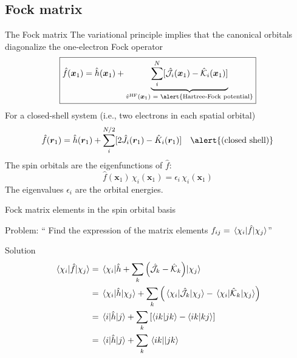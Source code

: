 \documentclass[aspectratio=169,9pt]{beamer}
\newcommand{\br}{\boldsymbol{r}}
\newcommand{\bx}{\boldsymbol{x}}
\newcommand{\hh}{\hat{h}}
\newcommand{\hf}{\hat{f}}
\newcommand{\hJ}{\hat{J}}
\newcommand{\hK}{\hat{K}}
\newcommand{\chJ}{\Hat{\mathcal{J}}}
\newcommand{\chK}{\Hat{\mathcal{K}}}
\newcommand{\violet}[1]{\textcolor{hfViolet}{#1}}
\begin{document}
\subsection{Fock matrix}
\begin{frame}{The Fock matrix}
	The \alert{variational principle} implies that the canonical orbitals diagonalize the \alert{one-electron Fock operator}
	\begin{equation*}
		\boxed{ \hf(\bx_1) = \hh(\bx_1) + \underbrace{\sum_i^N [\chJ_i(\bx_1) - \chK_i(\bx_1)]}_{\Hat{v}^\text{HF}(\bx_1) \text{ = \alert{Hartree-Fock potential}}}}
	\end{equation*}	
	 For a \alert{closed-shell system} (i.e., two electrons in each spatial orbital)
	 \begin{equation*}
		\hf(\br_1) = \hh(\br_1) + \sum_i^{N/2} [2 \hJ_i(\br_1) - \hK_i(\br_1)]	\quad \text{\alert{(closed shell)}}	
	\end{equation*}	
	The spin orbitals are the eigenfunctions of $\hf$:
	\begin{equation*}
		\boxed{\hf(\bx_1)\,\chi_i(\bx_1) = \epsilon_i \, \chi_i(\bx_1)}
	\end{equation*}	
	The eigenvalues $\epsilon_i$ are the \alert{orbital energies}.
\end{frame}

\begin{frame}{Fock matrix elements in the spin orbital basis}
	\begin{block}{Problem:}
		\violet{`` Find the expression of the matrix elements $f_{ij} = \mel{\chi_i}{\hf}{\chi_j}$''}
	\end{block}
	\pause
	\begin{block}{Solution}
		\begin{equation*}
		\begin{split}
			\mel{\chi_i}{\hf}{\chi_j} 
			& = \mel{\chi_i}{\hh + \sum_k \qty( \chJ_k - \chK_k)}{\chi_j}
			\\
			& = \mel{\chi_i}{\hh}{\chi_j} + \sum_k \qty( \mel{\chi_i}{\chJ_k}{\chi_j} - \mel{\chi_i}{\chK_k}{\chi_j} )
			\\
			& = \mel{i}{\hh}{j} + \sum_k \qty[ \braket{ik}{jk} - \braket{ik}{kj} ]
			\\
			& = \mel{i}{\hh}{j} + \sum_k \mel{ik}{}{jk}
		\end{split}
		\end{equation*}
	\end{block}
\end{frame}
\end{document}
